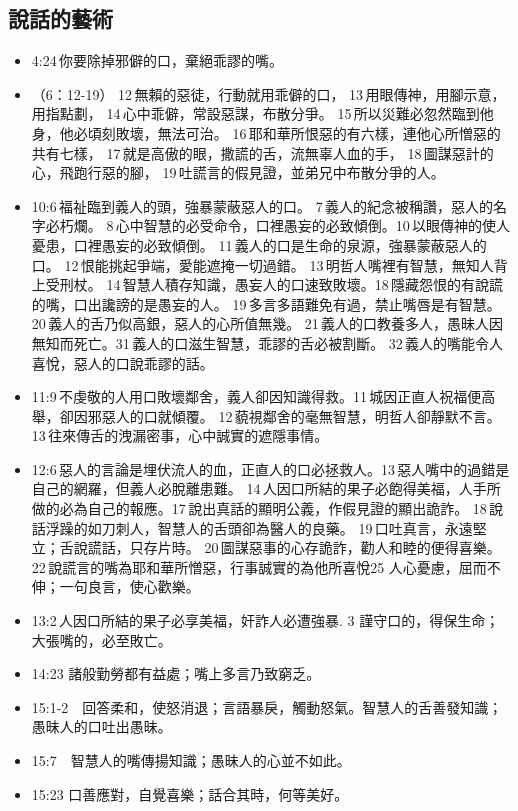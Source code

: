 \subsection{說話的藝術}
\begin{itemize}
\itemsep-.45em
\item 4:24 你要除掉邪僻的口，棄絕乖謬的嘴。
\item （6：12-19） 12 無賴的惡徒，行動就用乖僻的口， 13 用眼傳神，用腳示意，用指點劃， 14 心中乖僻，常設惡謀，布散分爭。 15 所以災難必忽然臨到他身，他必頃刻敗壞，無法可治。 16 耶和華所恨惡的有六樣，連他心所憎惡的共有七樣， 17 就是高傲的眼，撒謊的舌，流無辜人血的手， 18 圖謀惡計的心，飛跑行惡的腳， 19 吐謊言的假見證，並弟兄中布散分爭的人。 
\item 10:6 福祉臨到義人的頭，強暴蒙蔽惡人的口。 7 義人的紀念被稱讚，惡人的名字必朽爛。 8 心中智慧的必受命令，口裡愚妄的必致傾倒。10 以眼傳神的使人憂患，口裡愚妄的必致傾倒。 11 義人的口是生命的泉源，強暴蒙蔽惡人的口。 12 恨能挑起爭端，愛能遮掩一切過錯。 13 明哲人嘴裡有智慧，無知人背上受刑杖。 14 智慧人積存知識，愚妄人的口速致敗壞。18 隱藏怨恨的有說謊的嘴，口出讒謗的是愚妄的人。 19 多言多語難免有過，禁止嘴唇是有智慧。 20 義人的舌乃似高銀，惡人的心所值無幾。 21 義人的口教養多人，愚昧人因無知而死亡。31 義人的口滋生智慧，乖謬的舌必被割斷。 32 義人的嘴能令人喜悅，惡人的口說乖謬的話。
\item 11:9 不虔敬的人用口敗壞鄰舍，義人卻因知識得救。11 城因正直人祝福便高舉，卻因邪惡人的口就傾覆。 12 藐視鄰舍的毫無智慧，明哲人卻靜默不言。 13 往來傳舌的洩漏密事，心中誠實的遮隱事情。
\item 12:6 惡人的言論是埋伏流人的血，正直人的口必拯救人。13 惡人嘴中的過錯是自己的網羅，但義人必脫離患難。 14 人因口所結的果子必飽得美福，人手所做的必為自己的報應。17 說出真話的顯明公義，作假見證的顯出詭詐。 18 說話浮躁的如刀刺人，智慧人的舌頭卻為醫人的良藥。 19 口吐真言，永遠堅立；舌說謊話，只存片時。 20 圖謀惡事的心存詭詐，勸人和睦的便得喜樂。 22 說謊言的嘴為耶和華所憎惡，行事誠實的為他所喜悅25 人心憂慮，屈而不伸；一句良言，使心歡樂。
\item 13:2 人因口所結的果子必享美福，奸詐人必遭強暴. 3 謹守口的，得保生命；大張嘴的，必至敗亡。
\item 14:23 諸般勤勞都有益處；嘴上多言乃致窮乏。
\item 15:1-2　回答柔和，使怒消退；言語暴戾，觸動怒氣。智慧人的舌善發知識；愚昧人的口吐出愚昧。
\item 15:7　智慧人的嘴傳揚知識；愚昧人的心並不如此。
\item 15:23 口善應對，自覺喜樂；話合其時，何等美好。

\end{itemize}
